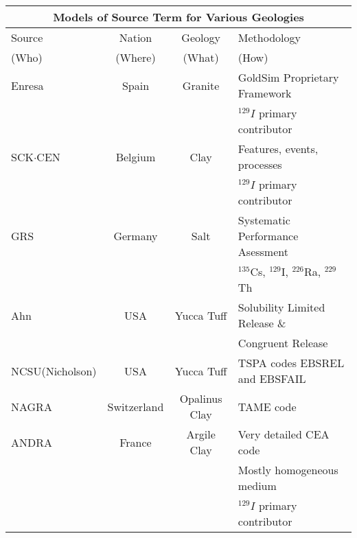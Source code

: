   \begin{table}[h!]
    \centering
    \footnotesize{
    \begin{tabular}{|l|c|c|l|}
      \multicolumn{4}{c}{\textbf{Models of Source Term for Various Geologies}}\\
      \hline
      Source & Nation & Geology & Methodology \\  
      (Who) & (Where) & (What) & (How) \\  
      \hline
      Enresa \cite{von_lensa_red-impact_2008}           & Spain       & Granite                   &  GoldSim Proprietary Framework\\ 
                                                        &             &                           & $^{129}I$ primary contributor \\
      SCK$\cdot$CEN   \cite{von_lensa_red-impact_2008}  & Belgium     & Clay                      & Features, events, processes\\
                                                        &             &                           & $^{129}I$ primary contributor \\
      GRS \cite{von_lensa_red-impact_2008}              & Germany     & Salt                      & Systematic Performance Asessment \\
                                                        &             &                           & $^{135}$Cs, $^{129}$I, $^{226}$Ra, $^{229}$Th \\
      Ahn \cite{ahn_environmental_2004, ahn_environmental_2007} & USA     & Yucca Tuff            & Solubility Limited Release \& \\ 
                                                        &             &                           & Congruent Release  \\
      NCSU(Nicholson) \cite{li_methodology_2006}        & USA         & Yucca Tuff                & TSPA codes EBSREL and EBSFAIL  \\ 
      NAGRA \cite{johnson_project_2002, johnson_calculations_2002}  & Switzerland & Opalinus Clay & TAME code  \\
      ANDRA \cite{andra_argile:_2005}                   & France      & Argile Clay               & Very detailed CEA code  \\
                                                        &             &                           & Mostly homogeneous medium \\
                                                        &             &                           & $^{129}I$ primary contributor \\

\end{tabular}}
\end{table}

